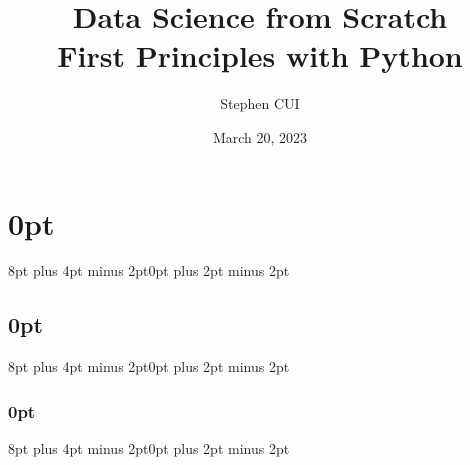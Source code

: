 \usepackage{amsmath, amssymb}
\usepackage{mathptmx}
\usepackage{siunitx}
\usepackage{ctex}
\usepackage{minted}
\usepackage{tcolorbox}
\usepackage{epigraph}
\usepackage{caption}
\usepackage{subcaption}
\usepackage{pdfpages}
\usepackage{graphicx}
\usepackage{listings}
\newtheorem{theorem}{Theorem}
\usepackage{tikz}
\usepackage{pifont}
\usepackage{tabularx}
\usepackage{framed}
\usepackage[lined,boxed,ruled]{algorithm2e}
\usepackage{titlesec}
\usepackage{bm}

\titlespacing\section{0pt}{8pt plus 4pt minus 2pt}{0pt plus 2pt minus 2pt}
\titlespacing\subsection{0pt}{8pt plus 4pt minus 2pt}{0pt plus 2pt minus 2pt}
\titlespacing\subsubsection{0pt}{8pt plus 4pt minus 2pt}{0pt plus 2pt minus 2pt}

\makeatletter
\let\old@endpart\@endpart
\renewcommand\@endpart[1][]{%
    \begin{quote}#1\end{quote}%
    \old@endpart}
\makeatother


\title{\textbf{Data Science from Scratch}\\First Principles with Python}

\author{Stephen CUI}
\date{March 20, 2023}

\newcommand\tips[1]{\textcolor{green!70!black}{#1}}
\newcommand\notes[1]{\textcolor{blue!70!black}{#1}}
\newcommand\important[1]{\textcolor{red!90!black}{#1}}

\newcommand\figures[1]{
    \begin{figure}
        \centering
        \texttt{[image: ../Figures/\#1.png]}
        \caption{#1}
        \label{#1}
    \end{figure}
}

